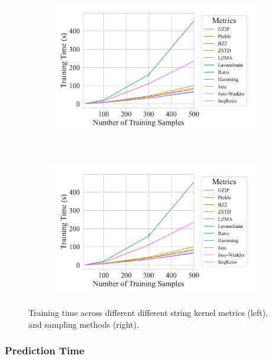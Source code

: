 \documentclass[sigconf]{acmart}
\begin{document}
\begin{figure}
	\begin{subfigure}
		\centering
		\includegraphics[width=.46\textwidth]{figs/kdd_nsl/metric_vs_train_time.pdf}
	\end{subfigure}
	~
	\begin{subfigure}
		\centering
		\includegraphics[width=.46\textwidth]{figs/kdd_nsl/metric_vs_train_time.pdf}
	\end{subfigure}
	\caption{Training time across different different string kernel metrics (left), and sampling methods (right).}
	\label{fig:training_time_kdd}
\end{figure}

\subsubsection{Prediction Time}
\end{document}
